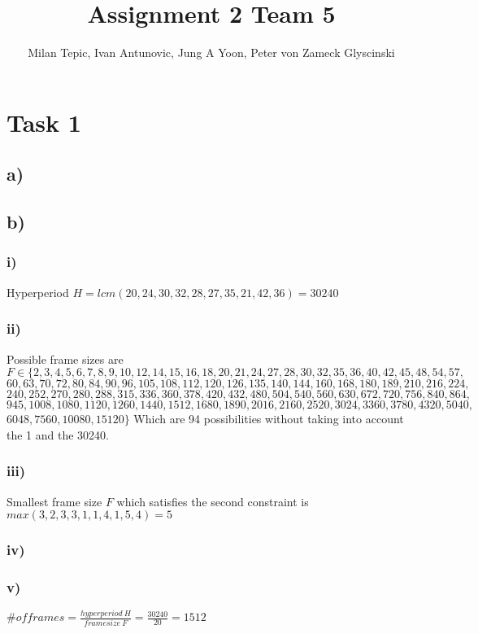 \documentclass[10pt,a4paper]{article}
\author{Milan Tepic, Ivan Antunovic, Jung A Yoon, Peter von Zameck Glyscinski}
\title{Assignment 2 Team 5}
\begin{document}
\maketitle

\section*{Task 1}
\subsection*{a)}
\subsection*{b)}
\subsubsection*{i)}
Hyperperiod $H = lcm(20,24,30,32,28,27,35,21,42,36) = 30240$

\subsubsection*{ii)}
Possible frame sizes are
\newline
$F\in \{2, 3, 4, 5, 6, 7, 8, 9, 10, 12, 14, 15, 16, 18, 20, 21, 24, 27, 28, 30, 32, 35, 36, 40, 42, 45, 48, 54, 57,$
$60, 63, 70, 72, 80, 84, 90, 96, 105, 108, 112, 120, 126, 135, 140, 144, 160, 168, 180, 189, 210, 216, 224,$
$240, 252, 270, 280, 288, 315, 336, 360, 378, 420, 432, 480, 504, 540, 560, 630, 672, 720, 756, 840, 864,$
$945, 1008, 1080, 1120, 1260, 1440, 1512, 1680, 1890, 2016, 2160, 2520, 3024, 3360, 3780, 4320, 5040,$
$6048, 7560, 10080, 15120\}$
\newline
Which are 94 possibilities without taking into account the 1 and the 30240.

\subsubsection*{iii)}
Smallest frame size $F$ which satisfies the second constraint is $max(3, 2, 3, 3, 1, 1, 4, 1, 5, 4) = 5$

\subsubsection*{iv)}

\subsubsection*{v)}
$\# of frames = \frac{hyperperiod ~H}{framesize ~F} = \frac{30240}{20} = 1512$ 
\end{document}
